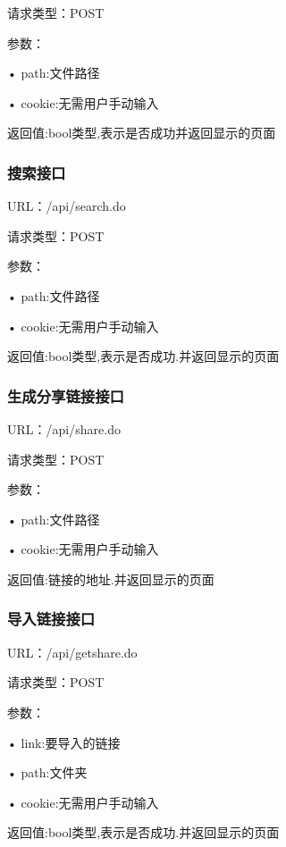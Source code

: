 请求类型：POST

参数： 

• path:文件路径

• cookie:无需用户手动输入

返回值:bool类型,表示是否成功并返回显示的页面

\subsubsection{搜索接口}
URL：/api/search.do

请求类型：POST

参数： 

• path:文件路径

• cookie:无需用户手动输入

返回值:bool类型,表示是否成功.并返回显示的页面

\subsubsection{生成分享链接接口}
URL：/api/share.do

请求类型：POST

参数： 

• path:文件路径

• cookie:无需用户手动输入

返回值:链接的地址.并返回显示的页面

\subsubsection{导入链接接口}
URL：/api/getshare.do

请求类型：POST

参数： 

• link:要导入的链接

• path:文件夹

• cookie:无需用户手动输入

返回值:bool类型,表示是否成功.并返回显示的页面

